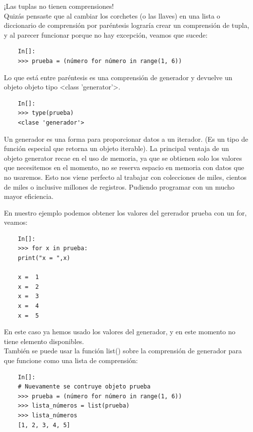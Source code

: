 ¡Las tuplas no tienen comprensiones!\\ 

Quizás pensaste que al cambiar los corchetes (o las llaves)  en una lista o diccionario de comprensión por  paréntesis lograría crear un comprensión de tupla, y al parecer funcionar porque no hay excepción, veamos que sucede:

\begin{lstlisting}
	In[]:	
	>>> prueba = (número for número in range(1, 6))
\end{lstlisting}

Lo que está entre paréntesis es una comprensión de generador y devuelve un objeto objeto tipo {\ttfamily  <{}class {}'{}generator{}'{}>{}}.

\begin{lstlisting}
	In[]:
	>>> type(prueba)
	<clase 'generador'>
\end{lstlisting}

Un generador es una forma para proporcionar datos a un iterador. (Es un tipo de función especial que retorna un objeto iterable). La principal ventaja de un objeto generator recae en el uso de memoria, ya que se obtienen solo los valores que necesitemos en el momento, no se reserva espacio en memoria con datos que no usaremos. Esto nos viene perfecto al trabajar con colecciones de miles, cientos de miles o inclusive millones de registros. Pudiendo  programar con un mucho mayor eficiencia.

En nuestro ejemplo podemos obtener los valores del gererador {\ttfamily prueba} con un {\ttfamily for}, veamos:


\begin{lstlisting}
	In[]:	
	>>> for x in prueba:
	print("x = ",x)
	
	x =  1
	x =  2
	x =  3
	x =  4
	x =  5
\end{lstlisting}

En este caso ya hemos usado los valores del generador, y en este momento no tiene elemento disponibles.\\

También se puede usar la función {\ttfamily list()} sobre la comprensión de generador para que funcione como
una lista de comprensión:

\begin{lstlisting}
	In[]:	
	# Nuevamente se contruye objeto prueba
	>>> prueba = (número for número in range(1, 6))
	>>> lista_números = list(prueba)
	>>> lista_números
	[1, 2, 3, 4, 5]
\end{lstlisting}

